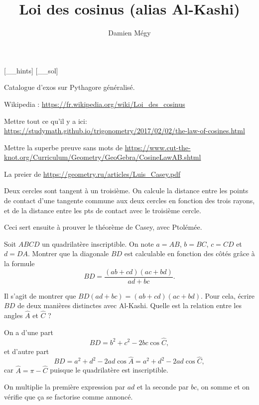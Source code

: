 





[_\jobname_hints]
[_\jobname_sol]


\title{Loi des cosinus (alias Al-Kashi)}
\author{Damien Mégy}
\maketitle


\avertissement 


Catalogue d'exos sur Pythagore généralisé.

Wikipedia : \url{https://fr.wikipedia.org/wiki/Loi_des_cosinus}

Mettre tout ce qu'il y a ici: \url{https://studymath.github.io/trigonometry/2017/02/02/the-law-of-cosines.html}

Mettre la superbe preuve sans mots de \url{https://www.cut-the-knot.org/Curriculum/Geometry/GeoGebra/CosineLawAB.shtml}



\begin{exo}
La preier de \url{https://geometry.ru/articles/Luis_Casey.pdf}

Deux cercles sont tangent à un troisième. On calcule la distance entre les points de contact d'une tangente commune aux deux cercles en fonction  des trois rayons, et de la distance entre les pts de contact avec le troisième cercle.

Ceci sert ensuite à prouver le théorème de Casey, avec Ptolémée.
\end{exo}


\begin{exo}
Soit $ABCD$ un quadrilatère inscriptible. On note $a=AB$, $b=BC$, $c=CD$ et $d=DA$.
Montrer que la diagonale $BD$ est calculable en fonction des côtés grâce à la formule
\[ BD = \frac{(ab+cd)(ac+bd)}{ad+bc}.\]
\begin{hint}
Il s'agit de montrer que $BD(ad+bc) = (ab+cd)(ac+bd)$.
Pour cela, écrire  $BD$ de deux manières distinctes avec Al-Kashi. 
Quelle est la relation entre les angles $\widehat A$ et $\widehat C$ ?
\end{hint}
\begin{sol}
On a d'une part 
\[BD  = b^2+c^2-2bc\cos \widehat C,\]
et d'autre part 
\[ BD = a^2+d^2-2ad\cos\widehat A =a^2+d^2-2ad\cos\widehat C, \]
car $\widehat A = \pi - \widehat C$ puisque le quadrilatère est inscriptible.

On multiplie la première expression par $ad$ et la seconde par $bc$, on somme et on vérifie que ça se factorise comme annoncé.
\end{sol}
\end{exo}



